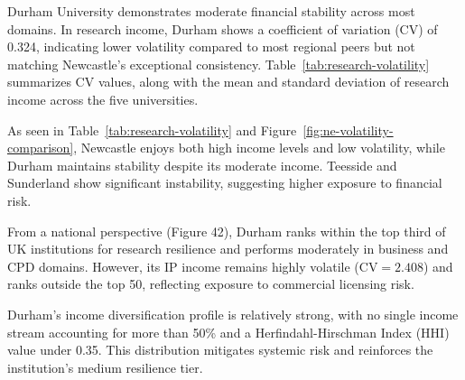 \documentclass[journal,onecolumn, 10pt,draftclsnofoot]{IEEEtran}
\begin{document}
Durham University demonstrates moderate financial stability across most domains. In research income, Durham shows a coefficient of variation (CV) of 0.324, indicating lower volatility compared to most regional peers but not matching Newcastle's exceptional consistency. Table~\ref{tab:research-volatility} summarizes CV values, along with the mean and standard deviation of research income across the five universities.
\vspace{0.25cm}
\begin{table}[h]
\centering
\caption{Research Income Volatility Analysis - North East Universities}
\vspace{0.1cm}
\label{tab:research-volatility}
\end{table}

As seen in Table~\ref{tab:research-volatility} and Figure~\ref{fig:ne-volatility-comparison}, Newcastle enjoys both high income levels and low volatility, while Durham maintains stability despite its moderate income. Teesside and Sunderland show significant instability, suggesting higher exposure to financial risk.

From a national perspective (Figure 42), Durham ranks within the top third of UK institutions for research resilience and performs moderately in business and CPD domains. However, its IP income remains highly volatile ($\mathrm{CV}=2.408$) and ranks outside the top 50, reflecting exposure to commercial licensing risk.

Durham's income diversification profile is relatively strong, with no single income stream accounting for more than 50\% and a Herfindahl-Hirschman Index (HHI) value under 0.35. This distribution mitigates systemic risk and reinforces the institution's medium resilience tier.
\end{document}
